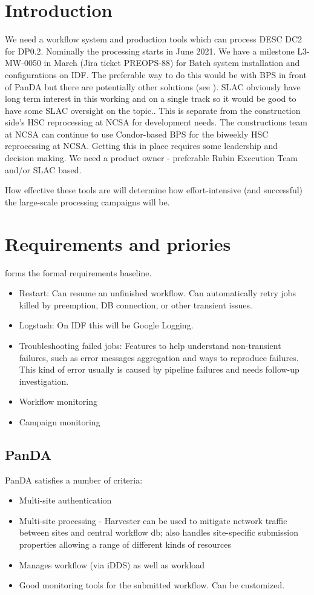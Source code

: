 \section{Introduction}

We need a workflow system and production tools which can process DESC DC2 for DP0.2. Nominally the processing starts in June 2021.
We have a milestone L3-MW-0050 in March (Jira ticket PREOPS-88) for Batch system installation and configurations on IDF.
The preferable way to do this would be with BPS in front of PanDA but there are potentially other solutions (see ).
SLAC obviously have long term interest in this working and on a single track so it would be good to have some SLAC oversight on the topic..
This is separate from the construction side's HSC reprocessing at NCSA for development needs. The  constructions team at NCSA can continue to use Condor-based BPS for the biweekly HSC reprocessing at NCSA.
Getting this in place requires some leadership and decision making. We need a product owner - preferable Rubin Execution Team and/or SLAC based.

How effective these tools are will determine how effort-intensive (and
successful) the large-scale processing campaigns will be.

\section {Requirements and priories}
 forms the formal requirements baseline.

\begin{itemize}
\item Restart: Can resume an unfinished workflow. Can automatically retry jobs killed by preemption, DB connection, or other transient issues.
\item Logstash: On IDF this will be Google Logging.
\item Troubleshooting failed jobs: Features to help understand non-transient failures, such as error messages aggregation and ways to reproduce failures. This kind of error usually is caused by pipeline failures and needs follow-up investigation.
\item Workflow monitoring
\item Campaign monitoring
\end{itemize}

\subsection{PanDA}
PanDA satisfies a number of criteria:
\begin{itemize}
\item Multi-site authentication
\item Multi-site processing - Harvester can be used to mitigate network traffic between sites and central workflow db; also handles site-specific submission properties allowing a range of different kinds of resources
\item Manages workflow (via iDDS) as well as workload
\item Good monitoring tools for the submitted workflow. Can be customized.
\end{itemize}

